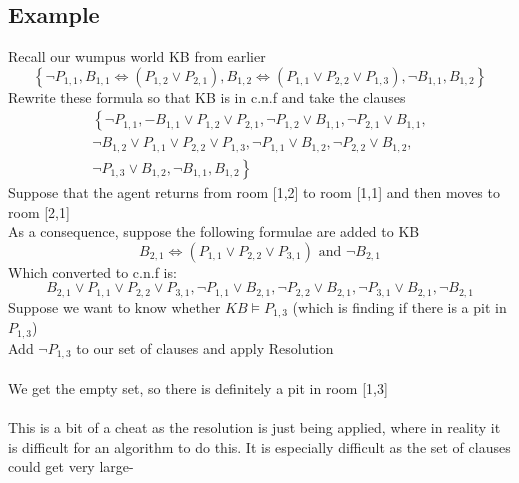 \documentclass{article}[18pt]
\begin{document}
\subsection{Example}
Recall our wumpus world KB from earlier
\[
\left\{\neg P_{1,1}, B_{1,1} \Leftrightarrow\left(P_{1,2}{\lor} P_{2,1}\right), B_{1,2} \Leftrightarrow\left(P_{1,1}{\lor} P_{2,2}{\lor} P_{1,3}\right), \neg B_{1,1}, B_{1,2}\right\}
\]
Rewrite these formula so that KB is in c.n.f and take the clauses
\[
\begin{array}{l}{\left\{\neg P_{1,1},-B_{1,1}\lor P_{1,2}\lor P_{2,1}, \neg P_{1,2}\lor B_{1,1}, \neg P_{2,1}\lor B_{1,1}\right.,} \\ {\neg B_{1,2}\lor P_{1,1}\lor P_{2,2}\lor P_{1,3}, \neg P_{1,1}\lor B_{1,2}, \neg P_{2,2}\lor B_{1,2},} \\ {\left.\neg P_{1,3}\lor B_{1,2}, \neg B_{1,1}, B_{1,2}\right\}}\end{array}
\]
Suppose that the agent returns from room [1,2] to room [1,1] and then moves to room [2,1]\\
As a consequence, suppose the following formulae are added to KB
\[
B_{2,1} \Leftrightarrow\left(P_{1,1}\lor P_{2,2}\lor P_{3,1}\right) \text { and } \neg B_{2,1}
\]
Which converted to c.n.f is:
\[
B_{2,1}\lor P_{1,1}\lor P_{2,2}\lor P_{3,1}, \neg P_{1,1}\lor B_{2,1}, \neg P_{2,2}\lor B_{2,1}, \neg P_{3,1}\lor B_{2,1}, \neg B_{2,1}
\]
Suppose we want to know whether $KB \models P_{1,3}$ (which is finding if there is a pit in $P_{1,3}$)\\
Add $\lnot P_{1,3}$ to our set of clauses and apply Resolution\\
\\
We get the empty set, so there is definitely a pit in room [1,3]\\
\\
This is a bit of a cheat as the resolution is just being applied, where in reality it is difficult for an algorithm to do this. It is especially difficult as the set of clauses could get very large-
\end{document}

